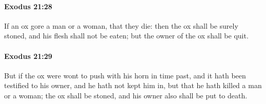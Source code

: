		\paragraph{Exodus 21:28} %
			\label{EXODUS-21-28}

			If an ox gore a man or a woman, that they die: then the ox shall be surely stoned, and his flesh shall not be eaten; but the owner of the ox shall be quit.


		\paragraph{Exodus 21:29} %
			\label{EXODUS-21-29}

			But if the ox were wont to push with his horn in time past, and it hath been testified to his owner, and he hath not kept him in, but that he hath killed a man or a woman; the ox shall be stoned, and his owner also shall be put to death.

